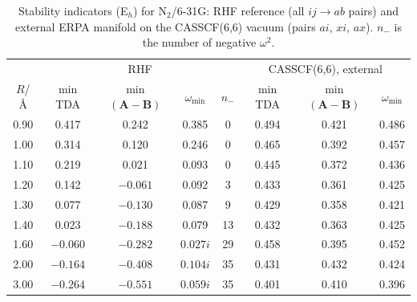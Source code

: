 \documentclass[aip,jcp,reprint,noshowkeys,superscriptaddress]{revtex4-1}
\newcommand{\bA}{\boldsymbol{A}}
\newcommand{\bB}{\boldsymbol{B}}
\begin{document}
\begin{table}[t]
\caption{Stability indicators (E$_h$) for N$_2$/6-31G: RHF reference (all
$ij\to ab$ pairs) and external ERPA manifold on the CASSCF(6,6) vacuum
(pairs $ai$, $xi$, $ax$).  $n_-$ is the number of negative $\omega^2$.}
\label{tab:stability}
\begin{ruledtabular}
\begin{tabular}{cccccccc}
& \multicolumn{4}{c}{RHF} & \multicolumn{3}{c}{CASSCF(6,6), external}\\
$R$/\AA & min TDA & min$(\bA{-}\bB)$ & $\omega_{\min}$ & $n_-$ & min TDA & min$(\bA{-}\bB)$ & $\omega_{\min}$\\
\hline
0.90 & 0.417 & 0.242 & 0.385 & 0 & 0.494 & 0.421 & 0.486\\
1.00 & 0.314 & 0.120 & 0.246 & 0 & 0.465 & 0.392 & 0.457\\
1.10 & 0.219 & 0.021 & 0.093 & 0 & 0.445 & 0.372 & 0.436\\
1.20 & 0.142 & $-0.061$ & 0.092 & 3 & 0.433 & 0.361 & 0.425\\
1.30 & 0.077 & $-0.130$ & 0.087 & 9 & 0.429 & 0.358 & 0.421\\
1.40 & 0.023 & $-0.188$ & 0.079 & 13 & 0.432 & 0.363 & 0.425\\
1.60 & $-0.060$ & $-0.282$ & $0.027i$ & 29 & 0.458 & 0.395 & 0.452\\
2.00 & $-0.164$ & $-0.408$ & $0.104i$ & 35 & 0.431 & 0.432 & 0.424\\
3.00 & $-0.264$ & $-0.551$ & $0.059i$ & 35 & 0.401 & 0.410 & 0.396\\
\end{tabular}
\end{ruledtabular}
\end{table}
\end{document}
